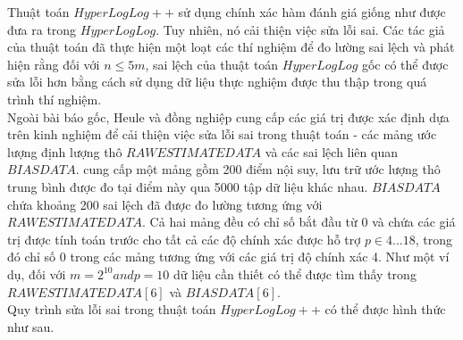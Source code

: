 \documentclass[letterpaper,13pt]{article}
\theoremstyle{mytheor}
\begin{document}
Thuật toán $HyperLogLog++$ sử dụng chính xác hàm đánh giá giống như được đưa ra trong $HyperLogLog$. Tuy nhiên, nó cải thiện việc sửa lỗi sai. 
Các tác giả của thuật toán đã thực hiện một loạt các thí nghiệm để đo lường sai lệch và phát hiện rằng đối với $n \le 5m$, 
sai lệch của thuật toán $HyperLogLog$ gốc có thể được sửa lỗi hơn bằng cách sử dụng dữ liệu thực nghiệm được thu thập trong quá trình thí nghiệm.\\

Ngoài bài báo gốc, Heule và đồng nghiệp cung cấp các giá trị được xác định dựa trên kinh nghiệm 
để cải thiện việc sửa lỗi sai trong thuật toán - các mảng ước lượng định lượng thô $RAWESTIMATEDATA$ và 
các sai lệch liên quan $BIASDATA$. cung cấp một mảng gồm 200 điểm nội suy, lưu trữ ước lượng thô trung bình được đo tại điểm này 
qua 5000 tập dữ liệu khác nhau. $BIASDATA$ chứa khoảng 200 sai lệch đã được đo lường tương ứng với $RAWESTIMATEDATA$. 
Cả hai mảng đều có chỉ số bắt đầu từ 0 và chứa các giá trị được tính toán trước cho tất cả các độ chính xác được hỗ trợ $p \in 4...18$,
trong đó chỉ số 0 trong các mảng tương ứng với các giá trị độ chính xác 4. Như một ví dụ, đối với $m = 2^{10} and p = 10$ 
dữ liệu cần thiết có thể được tìm thấy trong $RAWESTIMATEDATA[6]$ và $BIASDATA[6]$.\\
\newpage
Quy trình sửa lỗi sai trong thuật toán $HyperLogLog++$ có thể được hình thức như sau.\\
\end{document}
